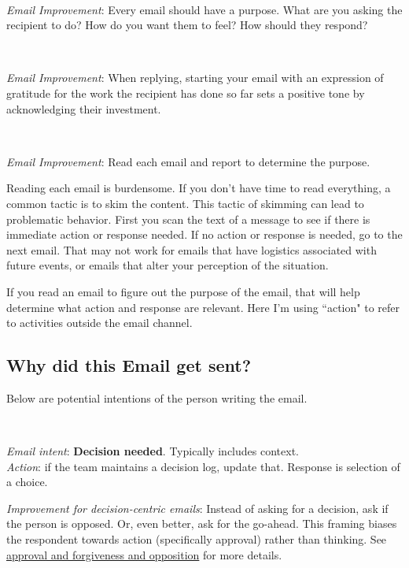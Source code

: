 \ \\
\begin{samepage}
\textit{Email Improvement}: Every email should have a purpose. What are you asking the recipient to do? How do you want them to feel? How should they respond?
\end{samepage}

\ \\
\begin{samepage}
\textit{Email Improvement}: When replying, starting your email with an expression of gratitude for the work the recipient has done so far sets a positive tone by acknowledging their investment.
\end{samepage}

\ \\
\begin{samepage}
\textit{Email Improvement}: Read each email and report to determine the purpose. 
\end{samepage}

Reading each email is burdensome. If you don't have time to read everything, a common tactic is to skim the content. 
This tactic of skimming can lead to problematic behavior. First you scan the text of a message to see if there is immediate action or response needed. If no action or response is needed, go to the next email. 
That may not work for emails that have logistics associated with future events, or emails that alter your perception of the situation.

If you read an email to figure out the purpose of the email, that will help determine what action and response are relevant. Here I'm using ``action" to refer to activities outside the email channel. 


\subsection*{Why did this Email get sent?}
Below are potential intentions of the person writing the email. 

\ \\
\begin{samepage}
\textit{Email intent}: \textbf{Decision needed}. Typically includes context. \\
\textit{Action}: if the team maintains a decision log, update that.
Response is selection of a choice.
\end{samepage}

\textit{Improvement for decision-centric emails}: Instead of asking for a decision, ask if the person is opposed. Or, even better, ask for the go-ahead. 
This framing biases the respondent towards action (specifically approval) rather than thinking. 
See 
\hyperref[sec:approval-forgiveness-opposition]{approval and forgiveness and opposition}
for more details.

